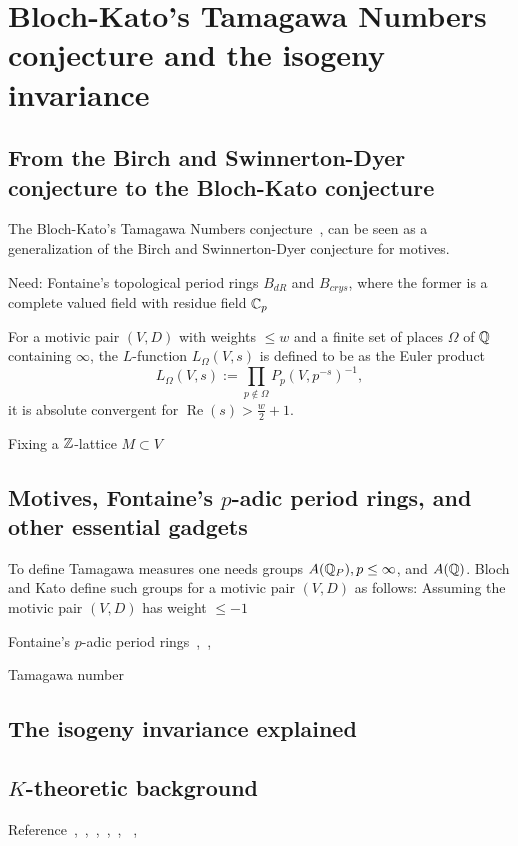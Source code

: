
\chapter{Bloch-Kato's Tamagawa Numbers conjecture and the isogeny invariance}
\label{chap1}

\tab

\section{From the Birch and Swinnerton-Dyer conjecture to the Bloch-Kato conjecture}
The Bloch-Kato's Tamagawa Numbers conjecture~\cite{BK1990}, can be seen as a generalization of the Birch and Swinnerton-Dyer conjecture for motives.

Need: Fontaine's topological period rings $B_{dR}$ and $B_{crys}$, where the former is a complete valued field with residue field $\mathbb{C}_p$

For a motivic pair $(V, D)$ with weights $\le w$ and a finite set of places $\Omega$ of $\mathbb{Q}$ containing $\infty$, the $L$-function $L_\Omega(V, s)$ is defined to be as the Euler product
\[
L_{\Omega}(V, s):=\prod_{p\not\in \Omega}P_p(V, p^{-s})^{-1},
\]
it is absolute convergent for $\operatorname{Re}(s)>\tfrac{w}{2}+1$.

Fixing a $\mathbb{Z}$-lattice $M\subset V$ 


\section{Motives, Fontaine's $p$-adic period rings, and other essential gadgets}
To define Tamagawa measures one needs groups $A(\mathbb{Q}_P), p \le \infty$, and $A(\mathbb{Q})$. Bloch and Kato define such groups for a motivic pair $(V, D)$ as follows:
Assuming the motivic pair $(V, D)$ has weight $\le -1$


Fontaine's $p$-adic period rings~\cite{Fon1982},~\cite{FM1987},

Tamagawa number~\cite{Wei1982}

\newpage
\section{The isogeny invariance explained}

\newpage
\section{$K$-theoretic background}
Reference~\cite{HB-K1},~\cite{HB-K2},~\cite{Sri1993},~\cite{TT1990},~\cite{Wei2013},~\cite{Wal1987a} ,~\cite{Wal1987b}


